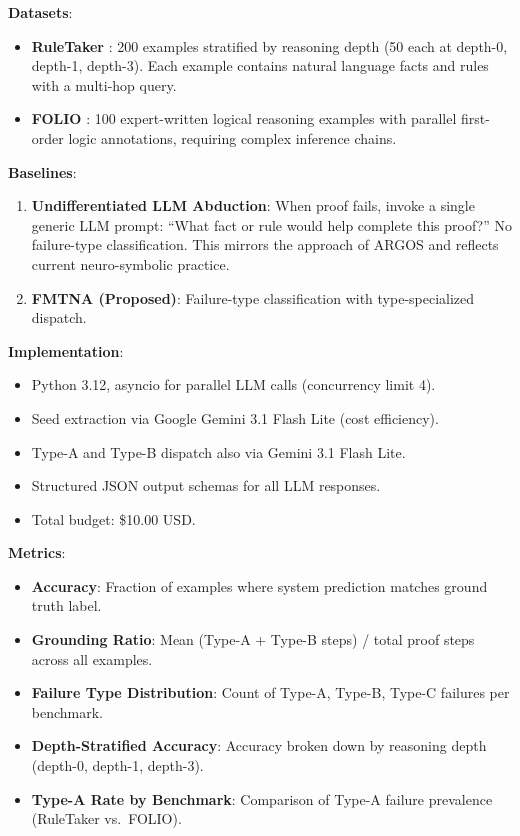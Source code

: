 \documentclass[11pt,letterpaper]{article}
\begin{document}
\textbf{Datasets}:
\begin{itemize}
  \item \textbf{RuleTaker} \citep{Clark2020}: 200 examples stratified by reasoning depth (50 each at depth-0, depth-1, depth-3). Each example contains natural language facts and rules with a multi-hop query.
  \item \textbf{FOLIO} \citep{Han2024}: 100 expert-written logical reasoning examples with parallel first-order logic annotations, requiring complex inference chains.
\end{itemize}

\textbf{Baselines}:
\begin{enumerate}
  \item \textbf{Undifferentiated LLM Abduction}: When proof fails, invoke a single generic LLM prompt: ``What fact or rule would help complete this proof?'' No failure-type classification. This mirrors the approach of ARGOS and reflects current neuro-symbolic practice.
  \item \textbf{FMTNA (Proposed)}: Failure-type classification with type-specialized dispatch.
\end{enumerate}

\textbf{Implementation}:
\begin{itemize}
  \item Python 3.12, asyncio for parallel LLM calls (concurrency limit 4).
  \item Seed extraction via Google Gemini 3.1 Flash Lite (cost efficiency).
  \item Type-A and Type-B dispatch also via Gemini 3.1 Flash Lite.
  \item Structured JSON output schemas for all LLM responses.
  \item Total budget: \$10.00 USD.
\end{itemize}

\textbf{Metrics}:
\begin{itemize}
  \item \textbf{Accuracy}: Fraction of examples where system prediction matches ground truth label.
  \item \textbf{Grounding Ratio}: Mean (Type-A + Type-B steps) / total proof steps across all examples.
  \item \textbf{Failure Type Distribution}: Count of Type-A, Type-B, Type-C failures per benchmark.
  \item \textbf{Depth-Stratified Accuracy}: Accuracy broken down by reasoning depth (depth-0, depth-1, depth-3).
  \item \textbf{Type-A Rate by Benchmark}: Comparison of Type-A failure prevalence (RuleTaker vs.\ FOLIO).
\end{itemize}
\end{document}
